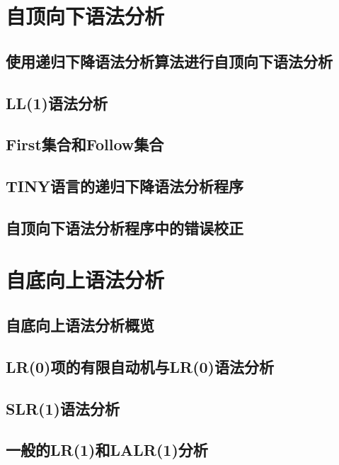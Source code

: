 \documentclass[lang=cn,10pt]{elegantbook}
\begin{document}
\chapter{自顶向下语法分析}
\label{chap:4}

\section{使用递归下降语法分析算法进行自顶向下语法分析}
\label{sec:4-1}

\section{LL(1)语法分析}
\label{sec:4-2}

\section{First集合和Follow集合}
\label{sec:4-3}

\section{TINY语言的递归下降语法分析程序}
\label{sec:4-4}

\section{自顶向下语法分析程序中的错误校正}
\label{sec:4-5}

\chapter{自底向上语法分析}
\label{chap:5}

\section{自底向上语法分析概览}
\label{sec:5-1}

\section{LR(0)项的有限自动机与LR(0)语法分析}
\label{sec:5-2}

\section{SLR(1)语法分析}
\label{sec:5-3}

\section{一般的LR(1)和LALR(1)分析}
\label{sec:5-4}
\end{document}
